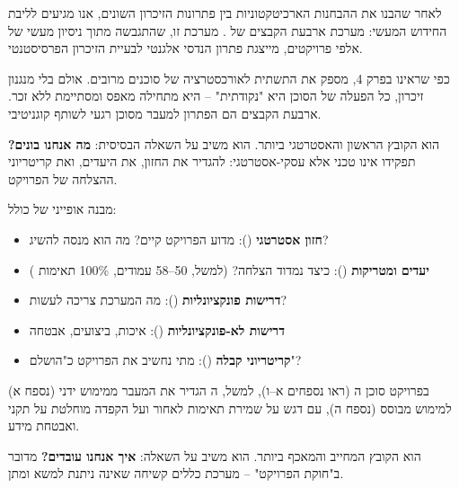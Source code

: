 

לאחר שהבנו את ההבחנות הארכיטקטוניות בין פתרונות הזיכרון השונים, אנו מגיעים לליבת החידוש המעשי: מערכת ארבעת הקבצים של . מערכת זו, שהתגבשה מתוך ניסיון מעשי של אלפי פרויקטים, מייצגת פתרון הנדסי אלגנטי לבעיית הזיכרון הפרסיסטנטי.

כפי שראינו בפרק \num{4},  מספק את התשתית לאורכסטרציה של סוכנים מרובים. אולם בלי מנגנון זיכרון, כל הפעלה של הסוכן היא "נקודתית" – היא מתחילה מאפס ומסתיימת ללא זכר. ארבעת הקבצים הם הפתרון למעבר מסוכן רגעי לשותף קוגניטיבי.


\textbf{} הוא הקובץ הראשון והאסטרטגי ביותר. הוא משיב על השאלה הבסיסית: \textbf{מה אנחנו בונים?} תפקידו אינו טכני אלא עסקי-אסטרטגי: להגדיר את החזון, את היעדים, ואת קריטריוני ההצלחה של הפרויקט.

מבנה אופייני של  כולל:
\begin{itemize}
  \item \textbf{חזון אסטרטגי} (): מדוע הפרויקט קיים? מה הוא מנסה להשיג?
  \item \textbf{יעדים ומטריקות} (): כיצד נמדוד הצלחה? (למשל, \num{50}–\num{58} עמודים, \num{100}\% תאימות )
  \item \textbf{דרישות פונקציונליות} (): מה המערכת צריכה לעשות?
  \item \textbf{דרישות לא-פונקציונליות} (): איכות, ביצועים, אבטחה
  \item \textbf{קריטריוני קבלה} (): מתי נחשיב את הפרויקט כ"הושלם"?
\end{itemize}

בפרויקט סוכן ה (ראו נספחים א–ו), למשל, ה הגדיר את המעבר ממימוש ידני (נספח א) למימוש מבוסס  (נספח ה), עם דגש על שמירת תאימות לאחור ועל הקפדה מוחלטת על תקני  ואבטחת מידע.


\textbf{} הוא הקובץ המחייב והמאכף ביותר. הוא משיב על השאלה: \textbf{איך אנחנו עובדים?} מדובר ב"חוקת הפרויקט" – מערכת כללים קשיחה שאינה ניתנת למשא ומתן.

